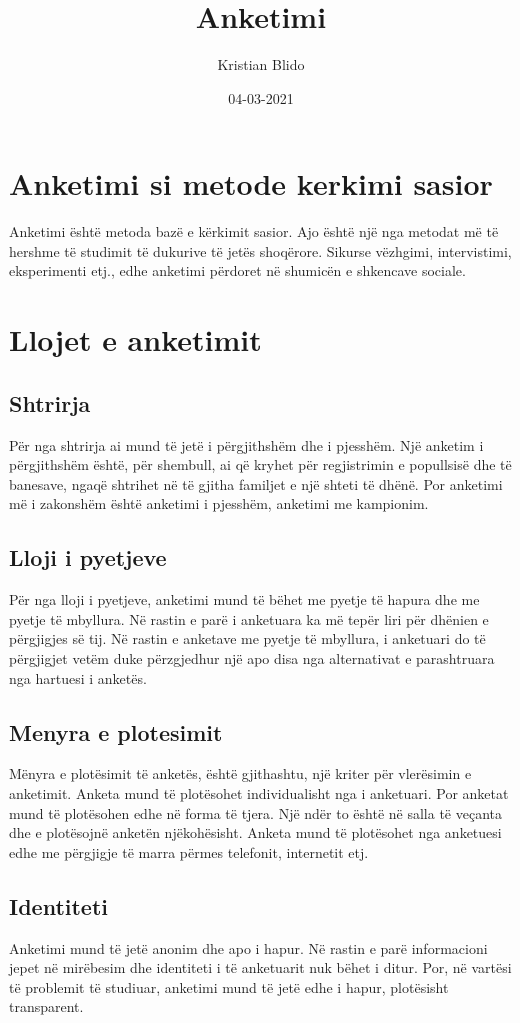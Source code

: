 \documentclass[12pt, a4paper]{article}
\title{Anketimi}
\author{Kristian Blido}
\date{04-03-2021}
\begin{document}
	\maketitle
	\section*{Anketimi si metode kerkimi sasior}
	Anketimi është metoda bazë e kërkimit sasior. Ajo është një nga metodat më të hershme të studimit të dukurive të jetës shoqërore. Sikurse vëzhgimi, intervistimi, eksperimenti etj., edhe anketimi përdoret në shumicën e shkencave sociale.

	\section*{Llojet e anketimit}
	\subsection*{Shtrirja}
Për nga shtrirja ai mund të jetë i përgjithshëm dhe i pjesshëm. Një anketim i përgjithshëm është, për shembull, ai që kryhet për regjistrimin e popullsisë dhe të banesave, ngaqë shtrihet në të gjitha familjet e një shteti të dhënë. Por anketimi më i zakonshëm është anketimi i pjesshëm, anketimi me kampionim.

\subsection*{Lloji i pyetjeve}
Për nga lloji i pyetjeve, anketimi mund të bëhet me pyetje të hapura dhe me pyetje të mbyllura. Në rastin e parë i anketuara ka më tepër liri për dhënien e përgjigjes së tij. Në rastin e anketave me pyetje të mbyllura, i anketuari do të përgjigjet vetëm duke përzgjedhur një apo disa nga alternativat e parashtruara nga hartuesi i anketës.

\subsection*{Menyra e plotesimit}
Mënyra e plotësimit të anketës, është gjithashtu, një kriter për vlerësimin e anketimit. Anketa mund të plotësohet individualisht nga i anketuari. Por anketat mund të plotësohen edhe në forma të tjera. Një ndër to është në salla të veçanta dhe e plotësojnë anketën njëkohësisht. Anketa mund të plotësohet nga anketuesi edhe me përgjigje të marra përmes telefonit, internetit etj.

\subsection*{Identiteti}
Anketimi  mund të jetë anonim dhe apo i hapur. Në rastin e parë informacioni jepet në mirëbesim dhe identiteti i të anketuarit nuk bëhet i ditur. Por, në vartësi të problemit të studiuar, anketimi mund të jetë edhe i hapur, plotësisht transparent.
\end{document}
